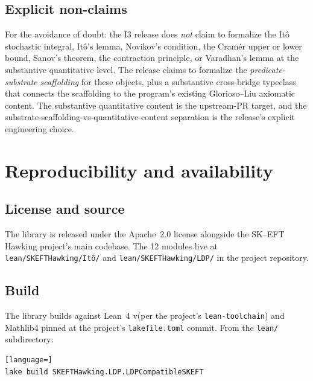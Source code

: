 \documentclass[11pt]{article}
\begin{document}
\subsection{Explicit non-claims}

For the avoidance of doubt: the I3 release does \emph{not} claim to
formalize the It\^o stochastic integral, It\^o's lemma, Novikov's
condition, the Cram\'er upper or lower bound, Sanov's theorem, the
contraction principle, or Varadhan's lemma at the substantive
quantitative level. The release claims to formalize the
\emph{predicate-substrate scaffolding} for these objects, plus a
substantive cross-bridge typeclass that connects the scaffolding to
the program's existing Glorioso--Liu axiomatic content. The
substantive quantitative content is the upstream-PR target, and the
substrate-scaffolding-vs-quantitative-content separation is the
release's explicit engineering choice.


\section{Reproducibility and availability}
\label{sec:availability}

\subsection{License and source}

The library is released under the Apache~2.0 license alongside the
SK--EFT Hawking project's main codebase. The 12 modules live at
\texttt{lean/SKEFTHawking/Itô/} and \texttt{lean/SKEFTHawking/LDP/}
in the project repository.

\subsection{Build}

The library builds against Lean~4 v\leantoolchain (per the project's
\texttt{lean-toolchain}) and Mathlib4 pinned at the project's
\texttt{lakefile.toml} commit. From the \texttt{lean/} subdirectory:

\begin{lstlisting}[language=]
lake build SKEFTHawking.LDP.LDPCompatibleSKEFT
\end{lstlisting}
\end{document}
